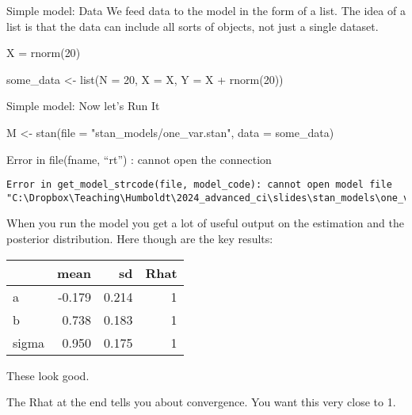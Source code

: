 \documentclass[
  11pt,
  ignorenonframetext,
]{beamer}
\newenvironment{Shaded}{\begin{snugshade}}{\end{snugshade}}
\newcommand{\AttributeTok}[1]{\textcolor[rgb]{0.40,0.45,0.13}{#1}}
\newcommand{\DecValTok}[1]{\textcolor[rgb]{0.68,0.00,0.00}{#1}}
\newcommand{\FunctionTok}[1]{\textcolor[rgb]{0.28,0.35,0.67}{#1}}
\newcommand{\NormalTok}[1]{\textcolor[rgb]{0.00,0.23,0.31}{#1}}
\newcommand{\OtherTok}[1]{\textcolor[rgb]{0.00,0.23,0.31}{#1}}
\newcommand{\SpecialCharTok}[1]{\textcolor[rgb]{0.37,0.37,0.37}{#1}}
\newcommand{\StringTok}[1]{\textcolor[rgb]{0.13,0.47,0.30}{#1}}
\begin{document}
\begin{frame}[fragile]{Simple model: Data}
\protect\hypertarget{simple-model-data-1}{}
We feed data to the model in the form of a list. The idea of a list is
that the data can include all sorts of objects, not just a single
dataset.

\begin{Shaded}
\begin{Highlighting}[]
\NormalTok{X }\OtherTok{=} \FunctionTok{rnorm}\NormalTok{(}\DecValTok{20}\NormalTok{)}

\NormalTok{some\_data }\OtherTok{\textless{}{-}} \FunctionTok{list}\NormalTok{(}\AttributeTok{N =} \DecValTok{20}\NormalTok{, }\AttributeTok{X =}\NormalTok{ X, }\AttributeTok{Y =}\NormalTok{ X }\SpecialCharTok{+} \FunctionTok{rnorm}\NormalTok{(}\DecValTok{20}\NormalTok{))}
\end{Highlighting}
\end{Shaded}
\end{frame}

\begin{frame}[fragile]{Simple model: Now let's Run It}
\protect\hypertarget{simple-model-now-lets-run-it-1}{}
\begin{Shaded}
\begin{Highlighting}[]
\NormalTok{M }\OtherTok{\textless{}{-}} \FunctionTok{stan}\NormalTok{(}\AttributeTok{file =} \StringTok{"stan\_models/one\_var.stan"}\NormalTok{, }\AttributeTok{data =}\NormalTok{ some\_data)}
\end{Highlighting}
\end{Shaded}

Error in file(fname, ``rt'') : cannot open the connection

\begin{verbatim}
Error in get_model_strcode(file, model_code): cannot open model file "C:\Dropbox\Teaching\Humboldt\2024_advanced_ci\slides\stan_models\one_var.stan"
\end{verbatim}

When you run the model you get a lot of useful output on the estimation
and the posterior distribution. Here though are the key results:

\begin{tabular}{l|r|r|r}
\hline
  & mean & sd & Rhat\\
\hline
a & -0.179 & 0.214 & 1\\
\hline
b & 0.738 & 0.183 & 1\\
\hline
sigma & 0.950 & 0.175 & 1\\
\hline
\end{tabular}

These look good.

The Rhat at the end tells you about convergence. You want this very
close to 1.
\end{frame}
\end{document}
